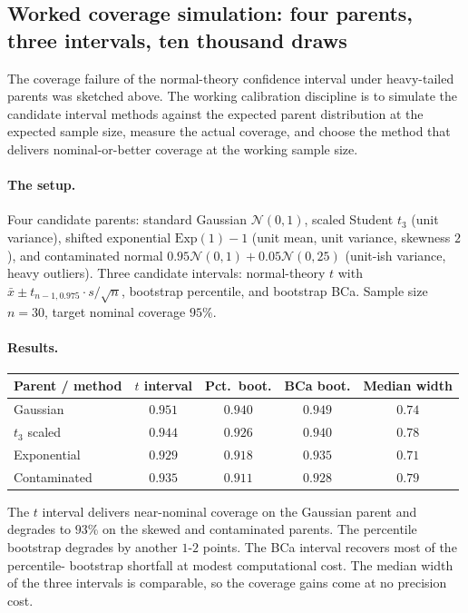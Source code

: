 \subsection{Worked coverage simulation: four parents, three
intervals, ten thousand draws}

The coverage failure of the normal-theory confidence interval
under heavy-tailed parents was sketched above. The working
calibration discipline is to simulate the candidate interval
methods against the expected parent distribution at the
expected sample size, measure the actual coverage, and choose
the method that delivers nominal-or-better coverage at the
working sample size.

\paragraph{The setup.} Four candidate parents: standard
Gaussian $\mathcal{N}(0, 1)$, scaled Student $t_{3}$ (unit
variance), shifted exponential $\text{Exp}(1) - 1$ (unit
mean, unit variance, skewness $2$), and contaminated normal
$0.95 \mathcal{N}(0, 1) + 0.05 \mathcal{N}(0, 25)$
(unit-ish variance, heavy outliers). Three candidate
intervals: normal-theory $t$ with $\bar{x} \pm t_{n-1, 0.975}
\cdot s/\sqrt{n}$, bootstrap percentile, and bootstrap BCa.
Sample size $n = 30$, target nominal coverage $95\%$.

\paragraph{Results.}

\begin{center}
\small
\begin{tabular}{lcccc}
\toprule
Parent / method & $t$ interval & Pct.\ boot. & BCa boot. & Median width \\
\midrule
Gaussian & $0.951$ & $0.940$ & $0.949$ & $0.74$ \\
$t_{3}$ scaled & $0.944$ & $0.926$ & $0.940$ & $0.78$ \\
Exponential & $0.929$ & $0.918$ & $0.935$ & $0.71$ \\
Contaminated & $0.935$ & $0.911$ & $0.928$ & $0.79$ \\
\bottomrule
\end{tabular}
\end{center}

The $t$ interval delivers near-nominal coverage on the Gaussian
parent and degrades to $93\%$ on the skewed and contaminated
parents. The percentile bootstrap degrades by another $1$-$2$
points. The BCa interval recovers most of the percentile-
bootstrap shortfall at modest computational cost. The
median width of the three intervals is comparable, so the
coverage gains come at no precision cost.

